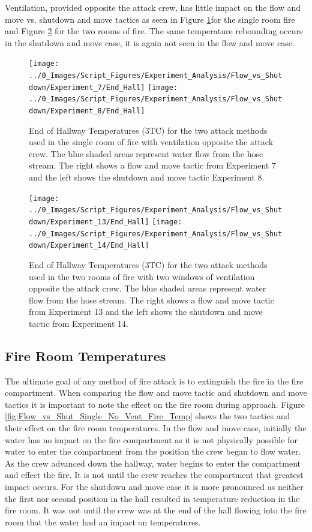 \documentclass[12pt,oneside]{book}
\begin{document}
Ventilation, provided opposite the attack crew, has little impact on the flow and move vs. shutdown and move tactics as seen in Figure \ref{fig:Flow_vs_Shut_Single_Vent}for the single room fire and Figure \ref{fig:Flow_vs_Shut_Two_Vent} for the two rooms of fire. The same temperature rebounding occurs in the shutdown and move case, it is again not seen in the flow and move case. 

\begin{figure}[H]
\centering
\texttt{[image: ../0\_Images/Script\_Figures/Experiment\_Analysis/Flow\_vs\_Shutdown/Experiment\_7/End\_Hall]}
\texttt{[image: ../0\_Images/Script\_Figures/Experiment\_Analysis/Flow\_vs\_Shutdown/Experiment\_8/End\_Hall]}
\caption[Single Room - Window Vent Opposite - Flow \& Move vs. Shutdown \& Move - Temperature]{End of Hallway Temperatures (3TC) for the two attack methods used in the single room of fire with ventilation opposite the attack crew. The blue shaded areas represent water flow from the hose stream. The right shows a flow and move tactic from Experiment 7 and the left shows the shutdown and move tactic Experiment 8.}
\label{fig:Flow_vs_Shut_Single_Vent}
\end{figure} 

\begin{figure}[H]
\centering
\texttt{[image: ../0\_Images/Script\_Figures/Experiment\_Analysis/Flow\_vs\_Shutdown/Experiment\_13/End\_Hall]}
\texttt{[image: ../0\_Images/Script\_Figures/Experiment\_Analysis/Flow\_vs\_Shutdown/Experiment\_14/End\_Hall]}
\caption[Two Room - Two Vents Opposite - Flow \& Move vs. Shutdown \& Move - Temperature]{End of Hallway Temperatures (3TC) for the two attack methods used in the two rooms of fire with two windows of ventilation opposite the attack crew. The blue shaded areas represent water flow from the hose stream. The right shows a flow and move tactic from Experiment 13 and the left shows the shutdown and move tactic from Experiment 14.}
\label{fig:Flow_vs_Shut_Two_Vent}
\end{figure}

\subsection{Fire Room Temperatures}
The ultimate goal of any method of fire attack is to extinguish the fire in the fire compartment. When comparing the flow and move tactic and shutdown and move tactics it is important to note the effect on the fire room during approach. Figure \ref{fig:Flow_vs_Shut_Single_No_Vent_Fire_Temp} shows the two tactics and their effect on the fire room temperatures. In the flow and move case, initially the water has no impact on the fire compartment as it is not physically possible for water to enter the compartment from the position the crew began to flow water. As the crew advanced down the hallway, water begins to enter the compartment and effect the fire. It is not until the crew reaches the compartment that greatest impact occurs. For the shutdown and move case it is more pronounced as neither the first nor second position in the hall resulted in temperature reduction in the fire room. It was not until the crew was at the end of the hall flowing into the fire room that the water had an impact on temperatures. 
\end{document}

